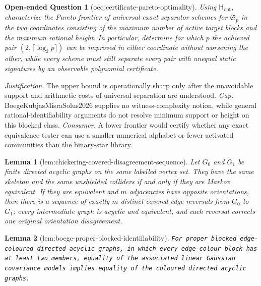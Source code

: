 \documentclass{article}
\newtheorem{lemma}{Lemma}
\newtheorem{openendedquestion}{Open-ended Question}
\begin{document}
\begin{openendedquestion}[oeq:certificate-pareto-optimality]\label{oeq:certificate-pareto-optimality}
Using \(\mathsf H_{\mathrm{opt}}\), characterize the Pareto frontier of universal exact separator schemes for \(\mathfrak S_p\) in the two coordinates consisting of the maximum number of active target blocks and the maximum rational height. In particular, determine for which \(p\) the achieved pair \((2,\lceil\log_2p\rceil)\) can be improved in either coordinate without worsening the other, while every scheme must still separate every pair with unequal static signatures by an observable polynomial certificate.
\end{openendedquestion}
\par\smallskip\noindent \textit{Justification.} The upper bound is operationally sharp only after the unavoidable support and arithmetic costs of universal separation are understood. \textit{Gap.} BoegeKubjasMisraSolus2026 supplies no witness-complexity notion, while general rational-identifiability arguments do not resolve minimum support or height on this blocked class. \textit{Consumer.} A lower frontier would certify whether any exact equivalence tester can use a smaller numerical alphabet or fewer activated communities than the binary-star library.

\begin{lemma}[lem:chickering-covered-disagreement-sequence]\label{lem:chickering-covered-disagreement-sequence}
Let \(G_0\) and \(G_1\) be finite directed acyclic graphs on the same labelled vertex set.  They have the same skeleton and the same unshielded colliders if and only if they are Markov equivalent.  If they are equivalent and \(m\) adjacencies have opposite orientations, then there is a sequence of exactly \(m\) distinct covered-edge reversals from \(G_0\) to \(G_1\); every intermediate graph is acyclic and equivalent, and each reversal corrects one original orientation disagreement.
\end{lemma}

\begin{lemma}[lem:boege-proper-blocked-identifiability]\label{lem:boege-proper-blocked-identifiability}
\texttt{For proper blocked edge-\allowbreak{}coloured directed acyclic graphs,\allowbreak{} in which every edge-\allowbreak{}colour block has at least two members,\allowbreak{} equality of the associated linear Gaussian covariance models implies equality of the coloured directed acyclic graphs.}
\end{lemma}
\end{document}
